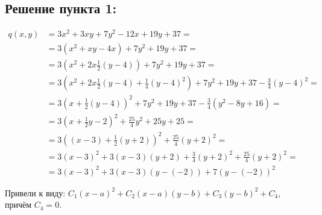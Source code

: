 \documentclass[12pt]{spbstu-task}
\begin{document}
\subsection*{Решение пункта 1:}
\begin{align*}
  q(x,y)
  &= 3x^2 + 3xy + 7y^2 - 12x + 19y + 37 =\\
  &= 3\left(x^2 + xy - 4x\right) + 7y^2 + 19y + 37 =\\
  &= 3\left(x^2 + 2x\frac{1}{2}\left(y - 4\right)\right) + 7y^2 + 19y + 37 =\\
  &= 3\left(x^2 + 2x\frac{1}{2}\left(y - 4\right) + \frac{1}{4}\left(y - 4\right)^2\right) + 7y^2 + 19y + 37 - \frac{3}{4}\left(y - 4\right)^2 =\\
  &= 3\left(x + \frac{1}{2}\left(y - 4\right)\right)^2 + 7y^2 + 19y + 37 - \frac{3}{4}\left(y^2 - 8y + 16\right) =\\
  &= 3\left(x + \frac{1}{2}y - 2\right)^2 + \frac{25}{4}y^2 + 25y + 25 =\\
  &= 3\left((x - 3) + \frac{1}{2}(y + 2)\right)^2 + \frac{25}{4}(y + 2)^2 =\\
  &= 3(x - 3)^2 + 3(x - 3)(y + 2) + \frac{3}{4}(y + 2)^2 + \frac{25}{4}(y + 2)^2 =\\
  &= 3\left(x - 3\right)^2 + 3\left(x - 3\right)\left(y - (-2)\right) + 7\left(y - (-2)\right)^2
\end{align*}

Привели к виду: \(C_1(x - a)^2 + C_2(x - a)(y - b) + C_3(y - b)^2 + C_4\), причём \(C_4 = 0\).
\end{document}
